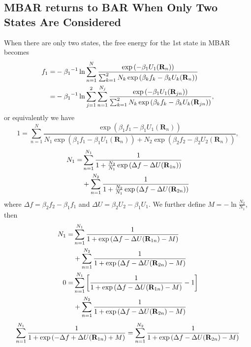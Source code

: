 \begin{appendices}
\chapter{MBAR returns to BAR When Only Two States Are Considered}
When there are only two states, the free energy for the 1st state in MBAR becomes
\begin{align}
f_1=&-{\beta_1}^{-1}\ln{\sum\limits_{n=1}^N \frac{\exp{\left(-\beta_1 U_1(\mathbf{R}_n)\right)}}{\sum_{k=1}^{2}N_k\exp{\left(\beta_kf_k-\beta_kU_k(\mathbf{R}_n)\right)}}}\notag\\
   =&-{\beta_1}^{-1}\ln{\sum\limits_{j=1}^{2}\sum\limits_{n=1}^{N_j} \frac{\exp{\left(-\beta_1 U_1(\mathbf{R}_{jn})\right)}}{\sum_{k=1}^{2}N_k\exp{\left(\beta_kf_k-\beta_kU_k(\mathbf{R}_{jn})\right)}}},
\end{align}
or equivalently we have
\begin{equation}
1=\sum\limits_{n=1}^{N} \frac{\exp{\left(\beta_1 f_1-\beta_1 U_1(\mathbf{R}_{n})\right)}}{N_1\exp{\left(\beta_1f_1-\beta_1U_1(\mathbf{R}_{n})\right)}+N_2\exp{\left(\beta_2f_2-\beta_2U_2(\mathbf{R}_{n})\right)}},
\end{equation}
\begin{align}
N_1=&\sum\limits_{n=1}^{N_1} \frac{1}{1+\frac{N_2}{N_1}\exp{\left(\Delta f-\Delta U(\mathbf{R}_{1n})\right)}}\notag\\
    &+\sum\limits_{n=1}^{N_2} \frac{1}{1+\frac{N_2}{N_1}\exp{\left(\Delta f-\Delta U(\mathbf{R}_{2n})\right)}}\notag\\
\end{align}
where $\Delta f=\beta_2 f_2-\beta_1 f_1$ and $\Delta U=\beta_2 U_2-\beta_1 U_1$. We further define $M=-\ln{\frac{N_2}{N_1}}$, then
\begin{align}    
N_1=&\sum\limits_{n=1}^{N_1} \frac{1}{1+\exp{\left(\Delta f-\Delta U(\mathbf{R}_{1n})-M\right)}}\notag\\
    &+\sum\limits_{n=1}^{N_2} \frac{1}{1+\exp{\left(\Delta f-\Delta U(\mathbf{R}_{2n})-M\right)}}\notag\\
0=&\sum\limits_{n=1}^{N_1}\left[ \frac{1}{1+\exp{\left(\Delta f-\Delta U(\mathbf{R}_{1n})-M\right)}}-1\right]\notag\\
  &+\sum\limits_{n=1}^{N_2} \frac{1}{1+\exp{\left(\Delta f-\Delta U(\mathbf{R}_{2n})-M\right)}}\notag
\end{align}
\begin{equation}
\sum\limits_{n=1}^{N_1}\frac{1}{1+\exp{\left(-\Delta f+\Delta U(\mathbf{R}_{1n})+M\right)}}
=\sum\limits_{n=1}^{N_2} \frac{1}{1+\exp{\left(\Delta f-\Delta U(\mathbf{R}_{2n})-M\right)}}\notag

\end{equation}
\end{appendices}

